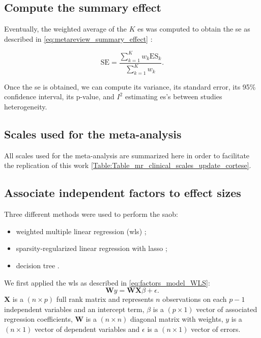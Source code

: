 \documentclass[12pt,a4paper,english]{article}
\begin{document}
\subsection{Compute the summary effect}

Eventually, the weighted average of the $K$ \gls{es} was computed to obtain the \gls{se} as described in 
\cref{eq:metareview_summary_effect} \citep{Borenstein2009}:

\begin{equation}
\label{eq:metareview_summary_effect}
\text{SE} = \frac{\sum_{k=1}^{K} w_k \text{ES}_k} {\sum_{k=1}^{K} w_k}.
\end{equation} 

Once the \gls{se}  is obtained, we can compute its variance, its standard error, its 95\% confidence interval, its p-value, 
and $I^2$ estimating \gls{es}'s between studies heterogeneity. 

\subsection{Scales used for the meta-analysis}

All scales used for the meta-analysis are summarized here in order to facilitate the replication of this work \cref{Table:Table_mr_clinical_scales_update_cortese}.

\subsection{Associate independent factors to effect sizes}

Three different methods were used to perform the \gls{saob}:
\begin{itemize}
	\item weighted multiple linear regression (\gls{wls}) \citep{Montgomery2012}; 
	\item sparsity-regularized linear regression with \gls{lasso} \citep{Tibshirani1996};
	\item decision tree \citep{Quinlan1986}.
\end{itemize}

We first applied the \gls{wls} as described in \cref{eq:factors_model_WLS}: 
\begin{equation}
\label{eq:factors_model_WLS}
\textbf{W}y = \textbf{WX}\beta + \epsilon.
\end{equation}
$\textbf{X}$ is a $(n \times p)$ full rank matrix and represents $n$ observations on each $p-1$ independent variables and an 
intercept term, $\beta$ is a $(p \times 1)$ vector of associated regression coefficients, $\textbf{W}$ is a $(n \times n)$ diagonal 
matrix with weights, $y$ is a $(n \times 1)$ vector of dependent variables and $\epsilon$ is a $(n \times 1)$ vector of errors.
\end{document}
